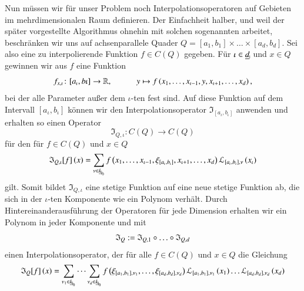       
      Nun müssen wir für unser Problem noch Interpolationsoperatoren auf Gebieten im mehrdimensionalen Raum definieren. Der Einfachheit halber, und weil der später vorgestellte Algorithmus ohnehin 
      mit solchen sogenannten  arbeitet, beschränken wir uns auf achsenparallele Quader $Q = [a_1,b_1] \times \dots \times [a_d,b_d]$. Sei also eine zu interpolierende Funktion
      $f \in C\left(Q\right)$ gegeben. Für $\iota \in \haken{d}$ und $x \in Q$ gewinnen wir aus $f$ eine Funktion
      \begin{equation*}
	f_{x,\iota} \colon [a_\iota,b\iota] \to \mathbb{R}, \ \ \ \ \ \ \ \ \ \ \ \ y \mapsto f\left(x_1, \dots , x_{\iota-1}, y , x_{\iota+1}, \dots , x_d\right),
      \end{equation*}
      bei der alle Parameter außer dem $\iota$-ten fest sind. Auf diese Funktion auf dem Intervall $[a_\iota,b_\iota]$ können wir den Interpolationsoperator $\mathfrak{I}_{[a_\iota,b_\iota]}$ 
      anwenden und erhalten so einen Operator
      \begin{equation*}
	\mathfrak{I}_{Q,\iota} \colon C\left(Q\right) \to C\left(Q\right)
      \end{equation*}
      für den für $f \in C\left(Q\right)$ und $x \in Q$
      \begin{equation*}
	\mathfrak{I}_{Q,\iota}[f]\left(x\right) = \sum_{\nu \in \nullhaken{k}} f\left(x_1, \dots , x_{\iota-1} , \xi_{[a_\iota,b_\iota]} , x_{\iota+1}, \dots , x_d\right) \lag_{[a_\iota,b_\iota],\nu}\left(x_\iota\right)
      \end{equation*}
      gilt.
      Somit bildet $\mathfrak{I}_{Q,\iota}$ eine stetige Funktion auf eine neue stetige Funktion ab, die sich in der $\iota$-ten Komponente wie ein Polynom verhält. Durch Hintereinanderausführung
      der Operatoren für jede Dimension erhalten wir ein Polynom in jeder Komponente und mit
      \begin{equation*}
	\mathfrak{I}_Q := \mathfrak{I}_{Q,1} \after \dots \after \mathfrak{I}_{Q,d}
      \end{equation*}
      einen Interpolationsoperator, der für alle $f \in C\left(Q\right)$ und $x \in Q$ die Gleichung
      \begin{equation}\label{eq:interpol}
	\mathfrak{I}_Q[f]\left(x\right) = \sum_{\nu_1 \in \nullhaken{k}} \dots \sum_{\nu_d \in \nullhaken{k}} 
			      f \left( \xi_{[a_1,b_1],\nu_1}, \dots , \xi_{[a_d,b_d],\nu_d} \right) 
			      \lag_{[a_1,b_1],\nu_1}\left(x_1\right) \dots  \lag_{[a_d,b_d],\nu_d}\left(x_d\right)
      \end{equation}
